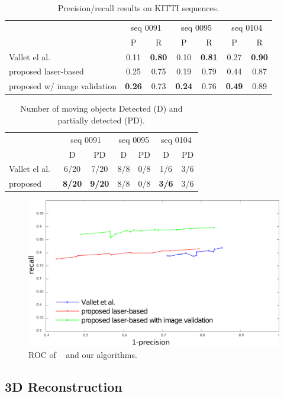 \begin{table}[t]
\caption{Precision/recall results on KITTI sequences.}
\label{tab:resPR}
\centering
\setlength{\tabcolsep}{3px}
\begin{tabular}{lcccccc}
\toprule                                                                                
&\multicolumn{2}{c}{seq 0091}&\multicolumn{2}{c}{seq 0095}&\multicolumn{2}{c}{seq 0104}\\
&P & R &P & R &P & R \\
\midrule
Vallet el al.~\cite{vallet2015extracting}       &       0.11&\textbf{0.80}      &       0.10&\textbf{0.81}      & 0.27&\textbf{0.90}\\
proposed laser-based                            &   0.25&0.75   &  0.19&0.79    & 0.44&0.87\\
proposed w/ image validation                            &       \textbf{0.26}&0.73      &  \textbf{0.24}&0.76   & \textbf{0.49}&0.89\\
\end{tabular}
\end{table}


\begin{table}[t]
\caption{Number of  moving objects Detected (D) and partially detected (PD).}
\label{tab:numPRobj}
\centering
\begin{tabular}{lcccccc}
\toprule 
&\multicolumn{2}{c}{seq 0091}&\multicolumn{2}{c}{seq 0095}&\multicolumn{2}{c}{seq 0104}\\
&D & PD &D & PD &D & PD \\
\midrule
Vallet el al.~\cite{vallet2015extracting}       & 6/20  & 7/20  & 8/8 &   0/8   &    1/6        & 3/6\\
proposed & \textbf{8/20}        & \textbf{9/20} & 8/8 &   0/8   &    \textbf{3/6}       & 3/6 \\
\end{tabular}
\end{table}

\begin{figure}[t]
\centering
\includegraphics[width=0.8\columnwidth]{./img/ch-laser/graphres3}
\caption{ROC of ~\cite{vallet2015extracting} and our algorithms.}
\label{fig:roc}
\end{figure}

\subsection{3D Reconstruction}




